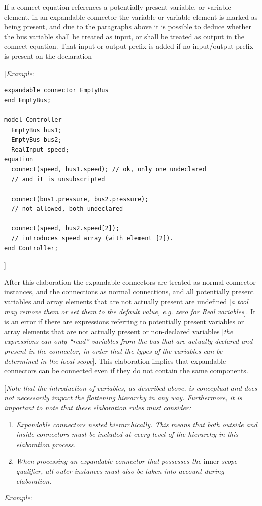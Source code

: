 \documentclass[10pt,a4paper]{report}
\begin{document}
\begin{itemize}
  If a connect equation references a potentially present variable, or
  variable element, in an expandable connector the variable or variable
  element is marked as being present, and due to the paragraphs above it
  is possible to deduce whether the bus variable shall be treated as
  input, or shall be treated as output in the connect equation. That
  input or output prefix is added if no input/output prefix is present
  on the declaration

{[}\emph{Example}:
\begin{lstlisting}[language=modelica]
expandable connector EmptyBus
end EmptyBus;

model Controller
  EmptyBus bus1;
  EmptyBus bus2;
  RealInput speed;
equation
  connect(speed, bus1.speed); // ok, only one undeclared
  // and it is unsubscripted
  
  connect(bus1.pressure, bus2.pressure);
  // not allowed, both undeclared
  
  connect(speed, bus2.speed[2]);
  // introduces speed array (with element [2]).
end Controller;
\end{lstlisting}
{]}
\end{itemize}

After this elaboration the expandable connectors are treated as normal
connector instances, and the connections as normal connections, and all
potentially present variables and array elements that are not actually
present are undefined {[}\emph{a tool may remove them or set them to the
default value, e.g. zero for Real variables}{]}. It is an error if there
are expressions referring to potentially present variables or array
elements that are not actually present or non-declared variables
{[}\emph{the expressions can only ``read'' variables from the bus that
are actually declared and present in the connector, in order that the
types of the variables can be determined in the local scope}{]}. This
elaboration implies that expandable connectors can be connected even if
they do not contain the same components.

{[}\emph{Note that the introduction of variables, as described above, is
conceptual and does not necessarily impact the flattening hierarchy in
any way. Furthermore, it is important to note that these elaboration
rules must consider:}

\begin{enumerate}
\item \emph{Expandable connectors nested hierarchically. This means that
both outside and inside connectors must be included at every level of
the hierarchy in this elaboration process.}
\item \emph{When processing an expandable connector that possesses the}
inner \emph{scope qualifier, all outer instances must also be taken into
account during elaboration}.
\end{enumerate}
\emph{Example}:
\end{document}
